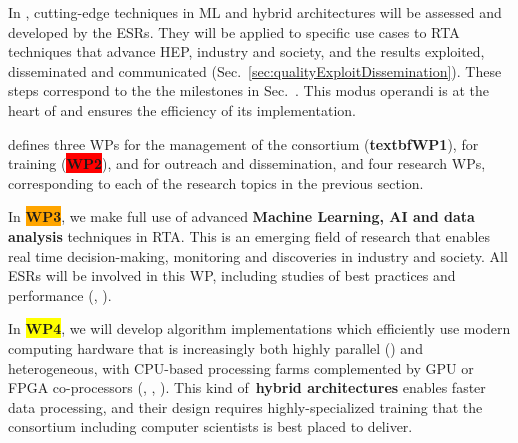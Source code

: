 





In \acronym, cutting-edge techniques in ML and hybrid architectures will be assessed and developed by the ESRs. They will be applied to specific use cases to RTA techniques that advance HEP, industry and society, and the results exploited, disseminated and communicated (Sec.~\ref{sec:qualityExploitDissemination}). These steps correspond to the the milestones in Sec.~\label{sub:milestones}. This modus operandi is at the heart of \acronym and ensures the efficiency of its implementation. 

\acronym defines three WPs for the management of the consortium (\textbf{textbf{\color{white}WP1\color{black}}}), for training (\textbf{\colorbox{red}{WP2}}), and for outreach and dissemination, and four research WPs, corresponding to each of the research topics in the previous section. 

In \textbf{\colorbox{orange}{WP3}}\color{black}, we make full use of advanced \textbf{Machine Learning, AI and data analysis} techniques in RTA. This is an emerging field of research that enables real time decision-making, monitoring and discoveries in industry and society. All ESRs will be involved in this WP, including studies of best practices and performance (\ESRh, \ESRi).

In \textbf{\colorbox{yellow}{WP4}}, we will develop algorithm implementations which efficiently use modern computing hardware that is increasingly both highly parallel (\ESRc) and heterogeneous, with CPU-based processing farms complemented by GPU or FPGA co-processors (\ESRf, \ESRg, \ESRl). 
This kind of~\textbf{hybrid architectures} enables faster data processing, and their design requires highly-specialized training that the consortium including computer scientists is best placed to deliver. 

